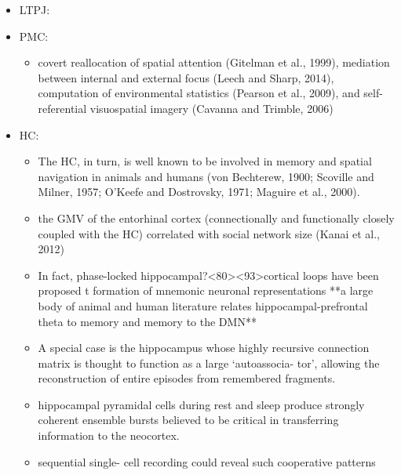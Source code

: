 \documentclass{article} %
\begin{document}
\begin{itemize}
\item

LTPJ:



\item
  PMC:
  \begin{itemize}
    \item
covert reallocation of spatial attention (Gitelman et al., 1999), mediation between internal and external focus (Leech and Sharp, 2014), computation of environmental statistics (Pearson et al., 2009), and self-referential visuospatial imagery (Cavanna and Trimble, 2006)
  \end{itemize}




\item
HC:
\begin{itemize}
  \item
The HC, in turn, is well known to be involved in memory and spatial navigation in animals and humans (von Bechterew, 1900; Scoville and Milner, 1957; O’Keefe and Dostrovsky, 1971; Maguire et al., 2000).

\item
the GMV of the entorhinal cortex (connectionally and functionally closely coupled with the HC) correlated with social network size (Kanai et al., 2012)


\item 
In fact, phase-locked hippocampal?<80><93>cortical loops have been proposed t
formation of mnemonic neuronal representations
**a large body of animal and human literature relates
hippocampal-prefrontal theta to memory and memory to the DMN**

\item 
A special case is the hippocampus whose highly recursive connection matrix is thought to function as a large ‘autoassocia- tor’, allowing the reconstruction of entire episodes from remembered fragments.

\item
hippocampal pyramidal cells during rest and sleep produce strongly coherent ensemble bursts believed to be critical in transferring information to the neocortex.

\item
sequential single- cell recording could reveal such cooperative patterns


\end{itemize}
\end{itemize}
\end{document}
